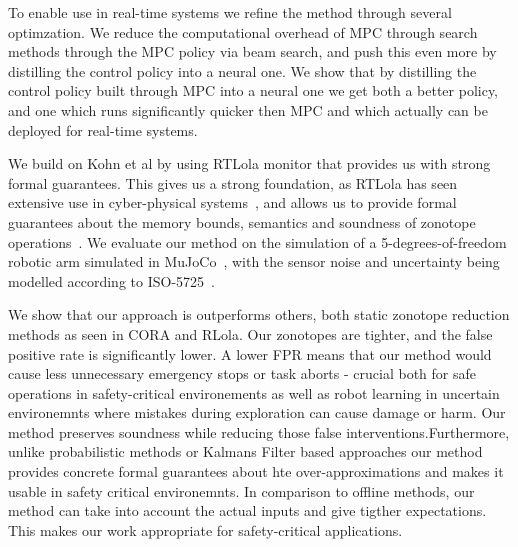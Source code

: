 \documentclass[letterpaper, 10 pt, conference]{ieeeconf}  %
\begin{document}
To enable use in real-time systems we refine the method through several optimzation.  We reduce the computational overhead of MPC through search methods through the MPC policy via beam search, and push this even more by distilling the control policy into a neural one. We show that by distilling the control policy built through MPC into a neural one we get both a better policy, and one which runs significantly quicker then MPC and which actually can be deployed for real-time systems.

We build on Kohn et al by using RTLola monitor that provides us with strong formal guarantees. This gives us a strong foundation, as RTLola has seen extensive use in cyber-physical systems~\cite{DBLP:conf/cav/rtlolauav,DBLP:conf/cav/rtloltakeoff,DBLP:conf/tacas/BiewerFHKSS21,DBLP:conf/rv/ros}, and allows us to provide formal guarantees about the memory bounds, semantics and soundness of zonotope operations~\cite{DBLP:journals/sttt/rtlolaverguar,DBLP:conf/fm/semantics,DBLP:conf/rv/vermonitors}. We evaluate our method on the simulation of a 5-degrees-of-freedom robotic arm simulated in MuJoCo~\cite{todorov2012mujoco}, with the sensor noise and uncertainty being modelled according to ISO-5725~\cite{iso5725-1-2023}.

We show that our approach is outperforms others, both static zonotope reduction methods as seen in CORA and RLola. Our zonotopes are tighter, and the false positive rate is significantly lower. A lower FPR means that our method would cause less unnecessary emergency stops or task aborts - crucial both for safe operations in safety-critical environements as well as robot learning in uncertain environemnts where mistakes during exploration can cause damage or harm. Our method preserves soundness while reducing those false interventions.Furthermore, unlike probabilistic methods or Kalmans Filter based approaches our method provides concrete formal guarantees about hte over-approximations and makes it usable in safety critical environemnts. In comparison to offline methods, our method can take into account the actual inputs and give tigther expectations. This makes our work appropriate for safety-critical applications. 
\end{document}
